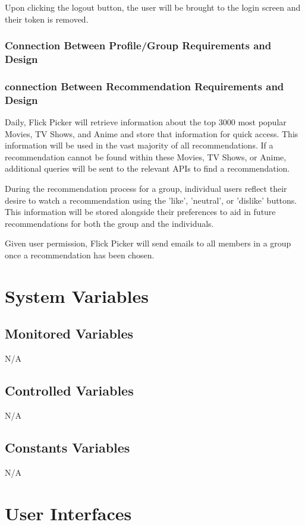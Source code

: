 \documentclass[12pt, titlepage]{article}
\begin{document}
Upon clicking the logout button, the user will be brought to the login screen and their token is removed.

\subsubsection{Connection Between Profile/Group Requirements and Design}


\subsubsection{connection Between Recommendation Requirements and Design}
\hspace*{14pt} Daily, Flick Picker will retrieve information about the top 3000 most popular Movies, TV Shows, and Anime and store that information for quick access. This information will be used in the vast majority of all recommendations. If a recommendation cannot be found within these Movies, TV Shows, or Anime, additional queries will be sent to the relevant APIs to find a recommendation.

During the recommendation process for a group, individual users reflect their desire to watch a recommendation using the 'like', 'neutral', or 'dislike' buttons. This information will be stored alongside their preferences to aid in future recommendations for both the group and the individuals. 

Given user permission, Flick Picker will send emails to all members in a group once a recommendation has been chosen. 

\section{System Variables}

\subsection{Monitored Variables}
N/A

\subsection{Controlled Variables}
N/A

\subsection{Constants Variables}
N/A

\section{User Interfaces}
\end{document}
